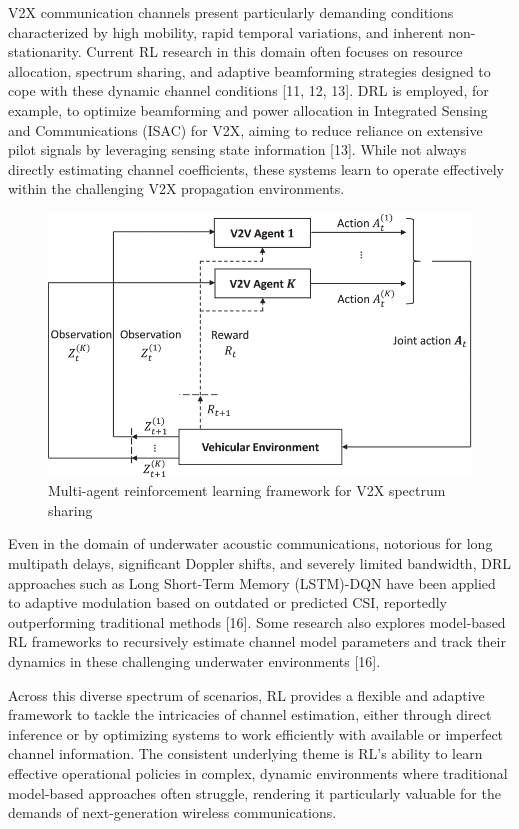 \documentclass[journal,twocolumn]{IEEEtran}
\begin{document}
V2X communication channels present particularly demanding conditions characterized by high mobility, rapid temporal variations, and inherent non-stationarity. Current RL research in this domain often focuses on resource allocation, spectrum sharing, and adaptive beamforming strategies designed to cope with these dynamic channel conditions [11, 12, 13]. DRL is employed, for example, to optimize beamforming and power allocation in Integrated Sensing and Communications (ISAC) for V2X, aiming to reduce reliance on extensive pilot signals by leveraging sensing state information [13]. While not always directly estimating channel coefficients, these systems learn to operate effectively within the challenging V2X propagation environments.

\begin{figure}[!b]
\centering
\includegraphics[width=\columnwidth]{fig_marl_v2x_spectrum_sharing.png}
\caption{Multi-agent reinforcement learning framework for V2X spectrum sharing}
\label{fig:marl_v2x}
\end{figure}

Even in the domain of underwater acoustic communications, notorious for long multipath delays, significant Doppler shifts, and severely limited bandwidth, DRL approaches such as Long Short-Term Memory (LSTM)-DQN have been applied to adaptive modulation based on outdated or predicted CSI, reportedly outperforming traditional methods [16]. Some research also explores model-based RL frameworks to recursively estimate channel model parameters and track their dynamics in these challenging underwater environments [16].

Across this diverse spectrum of scenarios, RL provides a flexible and adaptive framework to tackle the intricacies of channel estimation, either through direct inference or by optimizing systems to work efficiently with available or imperfect channel information. The consistent underlying theme is RL's ability to learn effective operational policies in complex, dynamic environments where traditional model-based approaches often struggle, rendering it particularly valuable for the demands of next-generation wireless communications.
\end{document}
